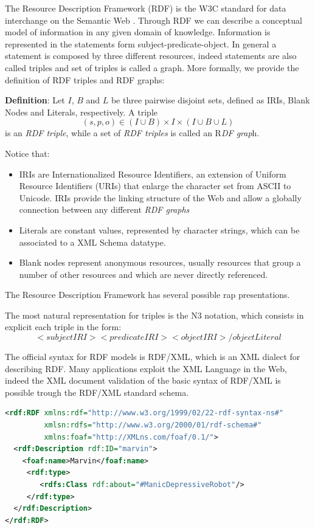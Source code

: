 The Resource Description Framework (RDF) is the W3C standard for data interchange on the Semantic Web \cite{rdfconcepts}. Through RDF we can describe a conceptual model of information in any given domain of knowledge. Information is represented in the statements form subject-predicate-object. In general a statement is composed by three different resources, indeed statements are also called triples and set of triples is called a graph. More formally, we provide the definition of RDF triples and RDF graphs:

\textbf{Definition}: Let $I$, $B$ and $L$ be three pairwise disjoint sets, defined as IRIs, Blank Nodes and Literals, respectively. A triple \[ (s, p, o) \in (I \cup B) × I × (I \cup B \cup L) \] is  an \textit{RDF triple}, while a set of \textit{RDF triples} is called an R\textit{DF grap}h.

Notice that:
\begin{itemize}
\item IRIs are Internationalized Resource Identifiers, an extension of Uniform Resource Identifiers (URIs) that enlarge the character set from ASCII to Unicode.  IRIs provide the linking structure of the Web and allow a globally connection between any different \textit{RDF graphs}
\item Literals are constant values, represented by character strings, which can be associated to a XML Schema datatype. 
\item Blank nodes represent anonymous resources, usually resources that group a number of other resources and which are never directly referenced.
\end{itemize}

The Resource Description Framework has several possible rap presentations.

The most natural representation for triples is the N3 notation, which consists in explicit each triple in the form:
 \[<subjectIRI> <predicateIRI> <objectIRI>/objectLiteral\]
 
The official syntax for RDF models is RDF/XML, which is an XML dialect for describing RDF. Many applications exploit the XML Language in the Web, indeed the XML document validation of the basic syntax of RDF/XML is possible trough the RDF/XML standard schema. 

\begin{lstlisting}[language=XML, caption=An example of a simple RDF/XML document:, label=code:rdf]
<rdf:RDF xmlns:rdf="http://www.w3.org/1999/02/22-rdf-syntax-ns#"
 		 xmlsn:rdfs="http://www.w3.org/2000/01/rdf-schema#"
 		 xmlns:foaf="http://XMLns.com/foaf/0.1/">
  <rdf:Description rdf:ID="marvin">
    <foaf:name>Marvin</foaf:name>
     <rdf:type>
        <rdfs:Class rdf:about="#ManicDepressiveRobot"/>
     </rdf:type>
  </rdf:Description>
</rdf:RDF>
\end{lstlisting}

